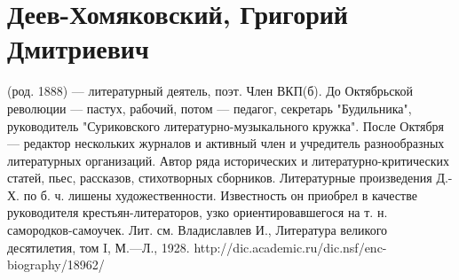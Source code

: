 \section{Деев-Хомяковский, Григорий Дмитриевич}
(род. 1888) — литературный деятель, поэт. Член ВКП(б). До Октябрьской революции — пастух, рабочий, потом — педагог, секретарь "Будильника", руководитель "Суриковского литературно-музыкального кружка". После Октября — редактор нескольких журналов и активный член и учредитель разнообразных литературных организаций. Автор ряда исторических и литературно-критических статей, пьес, рассказов, стихотворных сборников. Литературные произведения Д.-Х. по б. ч. лишены художественности. Известность он приобрел в качестве руководителя крестьян-литераторов, узко ориентировавшегося на т. н. самородков-самоучек.
Лит. см. Владиславлев И., Литература великого десятилетия, том I, М.—Л., 1928. 
http://dic.academic.ru/dic.nsf/enc-biography/18962/%

